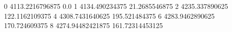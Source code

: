 0 4113.2216796875 0.0
1 4134.490234375 21.2685546875
2 4235.337890625 122.1162109375
4 4308.7431640625 195.521484375
6 4283.9462890625 170.724609375
8 4274.94482421875 161.72314453125

